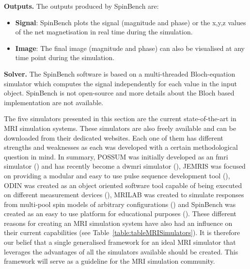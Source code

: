 \hfill

\textbf{Outputs.} The outputs produced by SpinBench are:
\begin{itemize}
    
    \item \textbf{Signal}: SpinBench plots the signal (magnitude and phase) or the x,y,z values of the net magnetisation in real time during the simulation.
    
    \item \textbf{Image}: The final image (magnitude and phase) can also be visualised at any time point during the simulation.
    
\end{itemize}

\hfill

\textbf{Solver.} The SpinBench software is based on a multi-threaded Bloch-equation simulator which computes the signal independently for each value in the input object.
SpinBench is not open-source and more details about the Bloch based implementation are not available.

\hfill

The five simulators presented in this section are the current state-of-the-art in MRI simulation systems.
These simulators are also freely available and can be downloaded from their dedicated websites.
Each one of them has different strengths and weaknesses as each was developed with a certain methodological question in mind.
In summary, 
POSSUM was initially developed as an \ac{fmri} simulator (\cite{Drobnjak2006}) and has recently become a \ac{dwmri} simulator (\cite{Graham2016}), 
JEMRIS was focused on providing a modular and easy to use pulse sequence development tool (\cite{Stocker2010}), 
ODIN was created as an object oriented software tool capable of being executed on different measurement devices (\cite{Jochimsen2004}),
MRILAB was created to simulate responses from multi-pool spin models of arbitrary configurations (\cite{Liu2017})
and
SpinBench was created as an easy to use platform for educational purposes (\cite{Overall2007}).
These different reasons for creating an MRI simulation system have also had an influence on their current capabilities (see Table~\ref{table:tableMRISimulators}).
It is therefore our belief that a single generalised framework for an ideal MRI simulator that leverages the advantages of all the simulators available should be created.
This framework will serve as a guideline for the MRI simulation community.




